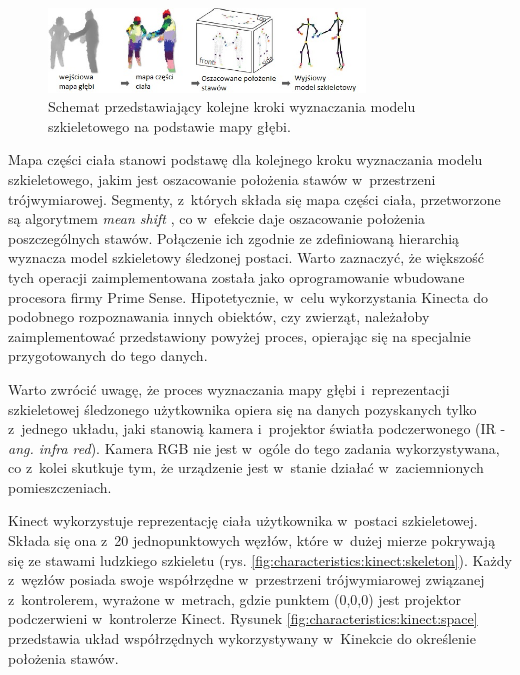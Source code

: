 \begin{savenotes}
	\begin{figure}[!htb]
		\centering	
		\includegraphics[width=0.75\textwidth]{images/KinectRecognitionSteps.jpg}
		\caption{Schemat przedstawiający kolejne kroki wyznaczania modelu szkieletowego na podstawie mapy głębi.}
		\label{fig:literature:kinect:classificationSteps}
	\end{figure}
\end{savenotes}
																									
Mapa części ciała stanowi podstawę dla kolejnego kroku wyznaczania modelu szkieletowego, jakim jest oszacowanie położenia stawów w~przestrzeni trójwymiarowej. Segmenty, z~których składa się mapa części ciała, przetworzone są algorytmem \emph{mean shift} \cite{Comaniciu2003}, co w~efekcie daje oszacowanie położenia poszczególnych stawów. Połączenie ich zgodnie ze zdefiniowaną hierarchią wyznacza model szkieletowy śledzonej postaci. Warto zaznaczyć, że większość tych operacji zaimplementowana została jako oprogramowanie wbudowane procesora firmy Prime Sense. Hipotetycznie, w~celu wykorzystania Kinecta do podobnego rozpoznawania innych obiektów, czy zwierząt, należałoby zaimplementować przedstawiony powyżej proces, opierając się na specjalnie przygotowanych do tego danych.

Warto zwrócić uwagę, że proces wyznaczania mapy głębi i~reprezentacji szkieletowej śledzonego użytkownika opiera się na danych pozyskanych tylko z~jednego układu, jaki stanowią kamera i~projektor światła podczerwonego (IR - \emph{ang. infra red}). Kamera RGB nie jest w~ogóle do tego zadania wykorzystywana, co z~kolei skutkuje tym, że urządzenie jest w~stanie działać w~zaciemnionych pomieszczeniach.
																									
Kinect wykorzystuje reprezentację ciała użytkownika w~postaci szkieletowej. Składa się ona z~20 jednopunktowych węzłów, które w~dużej mierze pokrywają się ze stawami ludzkiego szkieletu (rys. \ref{fig:characteristics:kinect:skeleton}). Każdy z~węzłów posiada swoje współrzędne w~przestrzeni trójwymiarowej związanej z~kontrolerem, wyrażone w~metrach, gdzie punktem (0,0,0) jest projektor podczerwieni w~kontrolerze Kinect. Rysunek \ref{fig:characteristics:kinect:space} przedstawia układ współrzędnych wykorzystywany w~Kinekcie do określenie położenia stawów. 
																									
